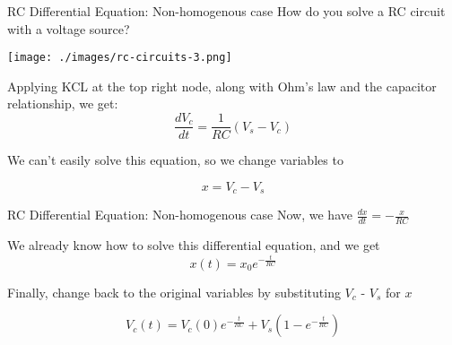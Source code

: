 \begin{frame}{RC Differential Equation: Non-homogenous case}
	How do you solve a RC circuit with a voltage source?
    
    \begin{center}
    	\texttt{[image: ./images/rc-circuits-3.png]}
    \end{center}
    
    Applying KCL at the top right node, along with Ohm’s law and the capacitor relationship, we get:
    \[\frac{dV_c}{dt} = \frac{1}{RC}(V_s - V_c)\]
    
    We can't easily solve this equation, so we change variables to
    
    \[x = V_c - V_s\]
\end{frame}

\begin{frame}{RC Differential Equation: Non-homogenous case}
	Now, we have $\frac{dx}{dt} = -\frac{x}{RC}$
    
    We already know how to solve this differential equation, and we get                              
    \[
        x(t) = x_0e^{-\frac{t}{RC}}
    \]
    
    Finally, change back to the original variables by substituting $V_c$ - $V_s$ for $x$
    
    \[V_c(t) = V_c(0)e^{-\frac{t}{RC}} + V_s(1 - e^{-\frac{t}{RC}})\]
\end{frame}
